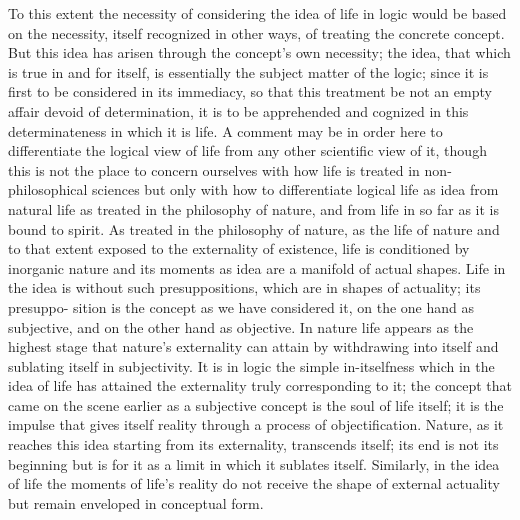 To this extent the necessity of considering the idea of life in logic would
be based on the necessity, itself recognized in other ways, of treating the
concrete concept. But this idea has arisen through the concept's own
necessity; the idea, that which is true in and for itself, is essentially the
subject matter of the logic; since it is first to be considered in its immediacy,
so that this treatment be not an empty affair devoid of determination, it is
to be apprehended and cognized in this determinateness in which it is life.
A comment may be in order here to differentiate the logical view of life
from any other scientific view of it, though this is not the place to concern
ourselves with how life is treated in non-philosophical sciences but only
with how to differentiate logical life as idea from natural life as treated in
the philosophy of nature, and from life in so far as it is bound to spirit.
 As
treated in the philosophy of nature, as the life of nature and to that extent
exposed to the externality of existence, life is conditioned by inorganic nature
and its moments as idea are a manifold of actual shapes. Life in the idea is
without such presuppositions, which are in shapes of actuality; its presuppo-
sition is the concept as we have considered it, on the one hand as subjective,
and on the other hand as objective. In nature life appears as the highest stage
that nature's externality can attain by withdrawing into itself and sublating
itself in subjectivity. It is in logic the simple in-itselfness which in the idea
of life has attained the externality truly corresponding to it; the concept
that came on the scene earlier as a subjective concept is the soul of life itself;
it is the impulse that gives itself reality through a process of objectification.
Nature, as it reaches this idea starting from its externality, transcends itself;
its end is not its beginning but is for it as a limit in which it sublates itself.
Similarly, in the idea of life the moments of life's reality do not receive the
shape of external actuality but remain enveloped in conceptual form.

